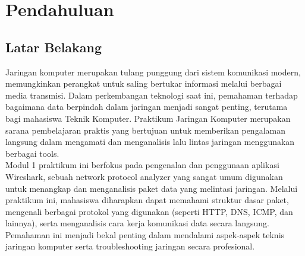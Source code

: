 \section{Pendahuluan}
\subsection{Latar Belakang}
Jaringan komputer merupakan tulang punggung dari sistem komunikasi modern, memungkinkan perangkat untuk saling bertukar informasi melalui berbagai media transmisi. Dalam perkembangan teknologi saat ini, pemahaman terhadap bagaimana data berpindah dalam jaringan menjadi sangat penting, terutama bagi mahasiswa Teknik Komputer. Praktikum Jaringan Komputer merupakan sarana pembelajaran praktis yang bertujuan untuk memberikan pengalaman langsung dalam mengamati dan menganalisis lalu lintas jaringan menggunakan berbagai tools.
\\ Modul 1 praktikum ini berfokus pada pengenalan dan penggunaan aplikasi Wireshark, sebuah network protocol analyzer yang sangat umum digunakan untuk menangkap dan menganalisis paket data yang melintasi jaringan. Melalui praktikum ini, mahasiswa diharapkan dapat memahami struktur dasar paket, mengenali berbagai protokol yang digunakan (seperti HTTP, DNS, ICMP, dan lainnya), serta menganalisis cara kerja komunikasi data secara langsung. Pemahaman ini menjadi bekal penting dalam mendalami aspek-aspek teknis jaringan komputer serta troubleshooting jaringan secara profesional.

